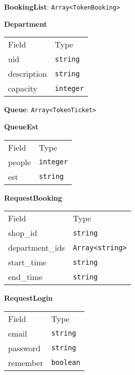\begin{center}\textbf{BookingList}: \texttt{Array<TokenBooking>}\end{center}


    \begin{table}[H]
    \centering
    \textbf{Department}\\
    \everyrow{\tabucline[0.5pt]-}
    \begin{tabu} to 0.55\textwidth {|X|X|} \hline
    Field & Type \\
    uid & \texttt{string} \\
description & \texttt{string} \\
capacity & \texttt{integer} \\
\end{tabu}
\end{table}

\begin{center}\textbf{Queue}: \texttt{Array<TokenTicket>}\end{center}


    \begin{table}[H]
    \centering
    \textbf{QueueEst}\\
    \everyrow{\tabucline[0.5pt]-}
    \begin{tabu} to 0.55\textwidth {|X|X|} \hline
    Field & Type \\
    people & \texttt{integer} \\
est & \texttt{string} \\
\end{tabu}
\end{table}


    \begin{table}[H]
    \centering
    \textbf{RequestBooking}\\
    \everyrow{\tabucline[0.5pt]-}
    \begin{tabu} to 0.55\textwidth {|X|X|} \hline
    Field & Type \\
    shop\_id & \texttt{string} \\
department\_ids & \texttt{Array<string>} \\
start\_time & \texttt{string} \\
end\_time & \texttt{string} \\
\end{tabu}
\end{table}


    \begin{table}[H]
    \centering
    \textbf{RequestLogin}\\
    \everyrow{\tabucline[0.5pt]-}
    \begin{tabu} to 0.55\textwidth {|X|X|} \hline
    Field & Type \\
    email & \texttt{string} \\
password & \texttt{string} \\
remember & \texttt{boolean} \\
\end{tabu}
\end{table}


